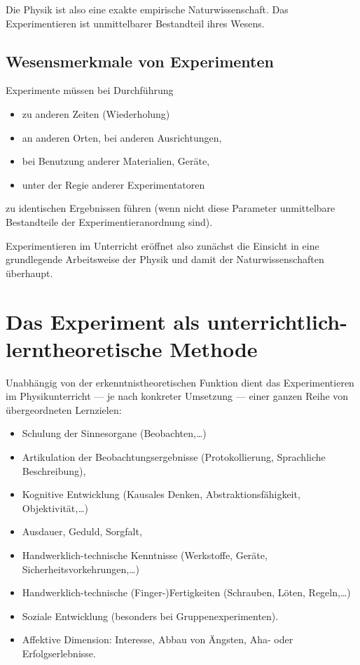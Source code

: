 Die Physik ist also eine exakte empirische Naturwissenschaft.
Das Experimentieren ist unmittelbarer Bestandteil ihres Wesens.

\subsection{Wesensmerkmale von Experimenten}

Experimente m\"{u}ssen bei Durchf\"{u}hrung
\begin{itemize}
	\item
	zu anderen Zeiten (Wiederholung)
	\item
	an anderen Orten, bei anderen Ausrichtungen,
	\item
	bei Benutzung anderer Materialien, Ger\"{a}te,
	\item
	unter der Regie anderer Experimentatoren
\end{itemize}
zu identischen Ergebnissen f\"{u}hren
(wenn nicht diese Parameter unmittelbare Bestandteile der
Experimentieranordnung sind).

\bip

Experimentieren im Unterricht er\"{o}ffnet also zun\"{a}chst die
Einsicht in eine grundlegende Arbeitsweise der Physik und
damit der Naturwissenschaften \"{u}berhaupt.


\bip\bip
\section{Das Experiment als unterrichtlich-lerntheoretische
                                          Methode}

Unabh\"{a}ngig von der erkenntnistheoretischen Funktion dient das
Experimentieren im Physikunterricht
--- je nach konkreter Umsetzung ---
einer ganzen Reihe von \"{u}bergeordneten Lernzielen:

\begin{itemize}
	\item
	Schulung der Sinnesorgane (Beobachten,\dots)
	\item
	Artikulation der Beobachtungsergebnisse (Protokollierung,
	Sprachliche Beschreibung),
	\item
	Kognitive Entwicklung (Kausales Denken, Abstraktionsf\"{a}higkeit,
	                                Objektivit\"{a}t,\dots)
	\item
	Ausdauer, Geduld, Sorgfalt,
	\item
	Handwerklich-technische Kenntnisse
	(Werkstoffe, Ger\"{a}te, Sicherheitsvorkehrungen,\dots)
	\item
	Handwerklich-technische (Finger-)Fertigkeiten
	(Schrauben, L\"{o}ten, Regeln,\dots)
	\item
	Soziale Entwicklung (besonders bei Gruppenexperimenten).
	\item
	Affektive Dimension: Interesse, Abbau von \"{A}ngsten,
	Aha-  oder Erfolgserlebnisse.
\end{itemize}

